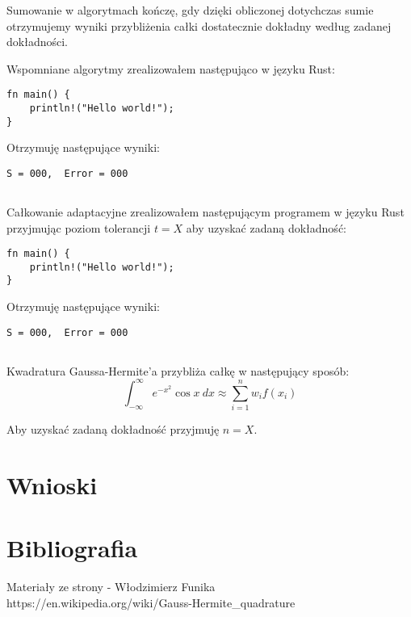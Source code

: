 \documentclass{article}
\begin{document}
\noindent
Sumowanie w algorytmach kończę, gdy dzięki obliczonej dotychczas sumie otrzymujemy wyniki przybliżenia całki dostatecznie dokładny według zadanej dokładności.

\vspace{5mm}
\noindent
Wspomniane algorytmy zrealizowałem następująco w języku Rust:
\begin{verbatim}
fn main() {
    println!("Hello world!");
}
\end{verbatim}

\noindent
Otrzymuję następujące wyniki:
\begin{verbatim}
S = 000,  Error = 000
\end{verbatim}

\subsection{}
Całkowanie adaptacyjne zrealizowałem następującym programem w języku Rust przyjmując poziom tolerancji \(t = X\) aby uzyskać zadaną dokładność:
\begin{verbatim}
fn main() {
    println!("Hello world!");
}
\end{verbatim}

\noindent
Otrzymuję następujące wyniki:
\begin{verbatim}
S = 000,  Error = 000
\end{verbatim}

\subsection{}
Kwadratura Gaussa-Hermite'a przybliża całkę w następujący sposób:
\[\int_{-\infty}^\infty e^{-x^2} \cos x\ dx \approx \sum_{i=1}^n w_i f(x_i)\]

\noindent
Aby uzyskać zadaną dokładność przyjmuję \(n = X\).

\section{Wnioski}

\section{Bibliografia}
Materiały ze strony - Włodzimierz Funika\\
https://en.wikipedia.org/wiki/Gauss-Hermite\_quadrature
\end{document}
